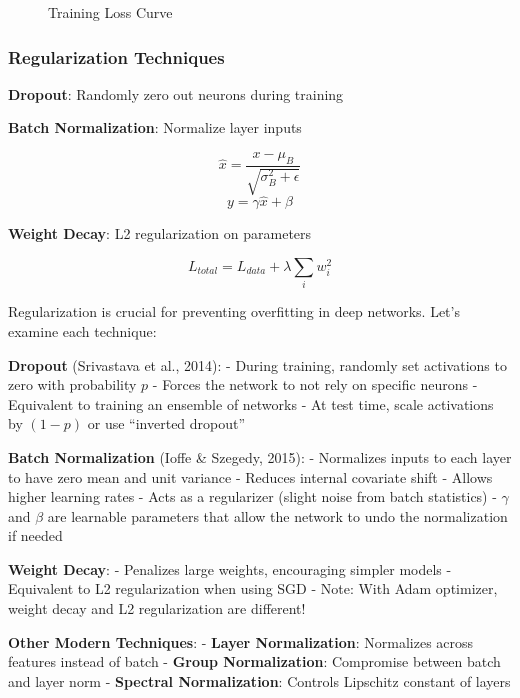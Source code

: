 \documentclass[
  11pt,
  letterpaper,
]{article}
\makeatletter
\newcommand*\pandocbounded[1]{%
  \sbox\pandoc@box{#1}%
  \Gscale@div\@tempa{\textheight}{\dimexpr\ht\pandoc@box+\dp\pandoc@box\relax}%
  \Gscale@div\@tempb{\linewidth}{\wd\pandoc@box}%
  \ifdim\@tempb\p@<\@tempa\p@\let\@tempa\@tempb\fi%
  \ifdim\@tempa\p@<\p@\scalebox{\@tempa}{\usebox\pandoc@box}%
  \else\usebox{\pandoc@box}%
  \fi%
}
\makeatother
\begin{document}
\begin{figure}[H]

{\centering \pandocbounded{\texttt{[image: figures/loss\_function.png]}}

}

\caption{Training Loss Curve}

\end{figure}%

\subsubsection{Regularization
Techniques}\label{regularization-techniques}

\textbf{Dropout}: Randomly zero out neurons during training

\textbf{Batch Normalization}: Normalize layer inputs

\[\hat{x} = \frac{x - \mu_B}{\sqrt{\sigma_B^2 + \epsilon}}\]
\[y = \gamma \hat{x} + \beta\]

\textbf{Weight Decay}: L2 regularization on parameters

\[L_{total} = L_{data} + \lambda \sum_i w_i^2\]

Regularization is crucial for preventing overfitting in deep networks.
Let's examine each technique:

\textbf{Dropout} (Srivastava et al., 2014): - During training, randomly
set activations to zero with probability \(p\) - Forces the network to
not rely on specific neurons - Equivalent to training an ensemble of
networks - At test time, scale activations by \((1-p)\) or use
``inverted dropout''

\textbf{Batch Normalization} (Ioffe \& Szegedy, 2015): - Normalizes
inputs to each layer to have zero mean and unit variance - Reduces
internal covariate shift - Allows higher learning rates - Acts as a
regularizer (slight noise from batch statistics) - \(\gamma\) and
\(\beta\) are learnable parameters that allow the network to undo the
normalization if needed

\textbf{Weight Decay}: - Penalizes large weights, encouraging simpler
models - Equivalent to L2 regularization when using SGD - Note: With
Adam optimizer, weight decay and L2 regularization are different!

\textbf{Other Modern Techniques}: - \textbf{Layer Normalization}:
Normalizes across features instead of batch - \textbf{Group
Normalization}: Compromise between batch and layer norm -
\textbf{Spectral Normalization}: Controls Lipschitz constant of layers
\end{document}

